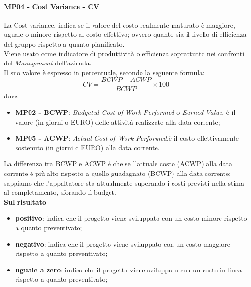 	 \paragraph{MP04 - Cost Variance - CV}
	 La Cost variance, indica se il valore del costo realmente maturato è maggiore, uguale o minore rispetto al costo effettivo; ovvero quanto sia il livello di efficienza del gruppo rispetto a quanto pianificato. \\
	 Viene usato come indicatore di produttività o efficienza soprattutto nei confronti del {\itshape Management} dell'azienda. \\
	 Il suo valore è espresso in percentuale, secondo la seguente formula:
	 \begin{displaymath}
	 	CV = \frac{BCWP - ACWP}{BCWP}\times100
	 \end{displaymath}
 		dove:
 		\begin{itemize}
 			\item {\bfseries MP02 - BCWP}: {\itshape Budgeted Cost of Work Performed} o {\itshape
 				Earned Value}, è il valore (in giorni o EURO) delle attività realizzate alla data corrente;
 			\item {\bfseries MP05 - ACWP}: {\itshape Actual Cost of Work Performed},è il costo effettivamente sostenuto (in giorni o EURO) alla data corrente.
 		\end{itemize}
 		La differenza tra BCWP e ACWP è che se l'attuale costo (ACWP) alla data corrente è più alto rispetto a quello guadagnato (BCWP) alla data corrente; sappiamo che l'appaltatore sta attualmente superando i costi previsti nella stima al completamento, sforando il budget.	\\
 	
 		{\bfseries Sul risultato}:
 		\begin{itemize}
 			\item {\bfseries positivo}: indica che il progetto viene sviluppato con un costo minore rispetto a quanto preventivato;
 			\item {\bfseries negativo}:  indica che il progetto viene sviluppato con un costo maggiore rispetto a quanto preventivato;
 			\item {\bfseries uguale a zero}: indica che il progetto viene sviluppato con un costo in linea rispetto a quanto preventivato;\\
 		\end{itemize} 
	
